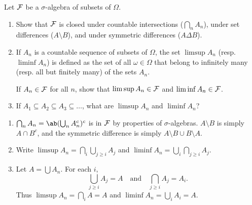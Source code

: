 \documentclass[12pt]{article}
\begin{document}
\begin{problem}
    Let $\mathcal F$ be a $\sigma$-algebra of subsets of $\Omega$.
    \begin{enumerate}[(1)]
        \item Show that $\mathcal F$ is closed under countable intersections
            ($\bigcap_n A_n$), under set differences ($A \setminus B$),
            and under symmetric differences ($A \Delta B$).
        \item If $A_n$ is a countable sequence of subsets of $\Omega$,
            the set $\limsup A_n$ (resp. $\liminf A_n$) is defined as
            the set of all $\omega \in \Omega$ that belong to infinitely
            many (resp. all but finitely many) of the sets $A_n$.

            If $A_n \in \mathcal F$ for all $n$, show that $\limsup A_n \in \mathcal F$
            and $\liminf A_n \in \mathcal F$.
        \item If $A_1 \subseteq A_2 \subseteq A_3 \subseteq \dots$,
            what are $\limsup A_n$ and $\liminf A_n$?
    \end{enumerate}
\end{problem}
\begin{solution} \leavevmode
  \begin{enumerate}[(1)]
    \item $\bigcap_n A_n = \ab(\bigcup_n A_n^c)^c$ is in $\mathcal F$
        by 
        {properties of $\sigma$-algebras}.
        $A \setminus B$ is simply $A \cap B^c$, and
        the symmetric difference is simply
        $A \setminus B \cup B \setminus A$.
    \item Write $\limsup A_n = \bigcap_{i} \bigcup_{j \ge i} A_j$
    and $\liminf A_n = \bigcup_i \bigcap_{j \ge i} A_j$.
    \item Let $A = \bigcup A_n$.
    For each $i$, \[
        \bigcup_{j\ge i} A_j = A
            \quad\text{and}\quad
        \bigcap_{j\ge i} A_j = A_i.
    \] Thus $\limsup A_n = \bigcap_i A = A$ and
    $\liminf A_n = \bigcup_i A_i = A$. \qedhere
  \end{enumerate}
\end{solution}
\end{document}
